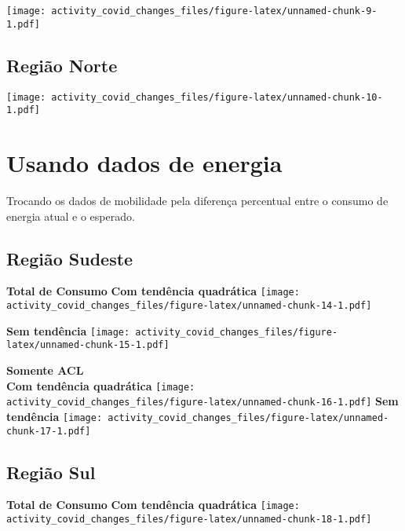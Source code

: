\documentclass[
]{article}
\begin{document}
\texttt{[image: activity\_covid\_changes\_files/figure-latex/unnamed-chunk-9-1.pdf]}

\pagebreak

\hypertarget{regiuxe3o-norte}{%
\subsection{Região Norte}\label{regiuxe3o-norte}}

\texttt{[image: activity\_covid\_changes\_files/figure-latex/unnamed-chunk-10-1.pdf]}

\pagebreak

\hypertarget{usando-dados-de-energia}{%
\section{Usando dados de energia}\label{usando-dados-de-energia}}

Trocando os dados de mobilidade pela diferença percentual entre o
consumo de energia atual e o esperado.

\hypertarget{regiuxe3o-sudeste-1}{%
\subsection{Região Sudeste}\label{regiuxe3o-sudeste-1}}

\textbf{Total de Consumo} \textbf{Com tendência quadrática}
\texttt{[image: activity\_covid\_changes\_files/figure-latex/unnamed-chunk-14-1.pdf]}

\textbf{Sem tendência}
\texttt{[image: activity\_covid\_changes\_files/figure-latex/unnamed-chunk-15-1.pdf]}

\pagebreak

\textbf{Somente ACL}\\
\textbf{Com tendência quadrática}
\texttt{[image: activity\_covid\_changes\_files/figure-latex/unnamed-chunk-16-1.pdf]}
\textbf{Sem tendência}
\texttt{[image: activity\_covid\_changes\_files/figure-latex/unnamed-chunk-17-1.pdf]}

\pagebreak

\hypertarget{regiuxe3o-sul-1}{%
\subsection{Região Sul}\label{regiuxe3o-sul-1}}

\textbf{Total de Consumo} \textbf{Com tendência quadrática}
\texttt{[image: activity\_covid\_changes\_files/figure-latex/unnamed-chunk-18-1.pdf]}
\end{document}
